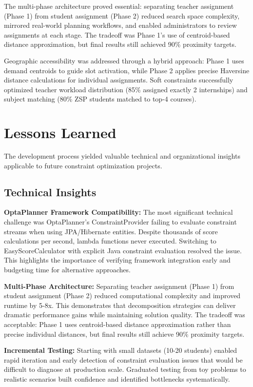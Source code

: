\documentclass[12pt,a4paper]{report}
\begin{document}
The multi-phase architecture proved essential: separating teacher assignment (Phase 1) from student assignment (Phase 2) reduced search space complexity, mirrored real-world planning workflows, and enabled administrators to review assignments at each stage. The tradeoff was Phase 1's use of centroid-based distance approximation, but final results still achieved 90\% proximity targets.

Geographic accessibility was addressed through a hybrid approach: Phase 1 uses demand centroids to guide slot activation, while Phase 2 applies precise Haversine distance calculations for individual assignments. Soft constraints successfully optimized teacher workload distribution (85\% assigned exactly 2 internships) and subject matching (80\% ZSP students matched to top-4 courses).

\section{Lessons Learned}

The development process yielded valuable technical and organizational insights applicable to future constraint optimization projects.

\subsection{Technical Insights}

\textbf{OptaPlanner Framework Compatibility:} The most significant technical challenge was OptaPlanner's ConstraintProvider failing to evaluate constraint streams when using JPA/Hibernate entities. Despite thousands of score calculations per second, lambda functions never executed. Switching to EasyScoreCalculator with explicit Java constraint evaluation resolved the issue. This highlights the importance of verifying framework integration early and budgeting time for alternative approaches.

\textbf{Multi-Phase Architecture:} Separating teacher assignment (Phase 1) from student assignment (Phase 2) reduced computational complexity and improved runtime by 5-8x. This demonstrates that decomposition strategies can deliver dramatic performance gains while maintaining solution quality. The tradeoff was acceptable: Phase 1 uses centroid-based distance approximation rather than precise individual distances, but final results still achieve 90\% proximity targets.

\textbf{Incremental Testing:} Starting with small datasets (10-20 students) enabled rapid iteration and early detection of constraint evaluation issues that would be difficult to diagnose at production scale. Graduated testing from toy problems to realistic scenarios built confidence and identified bottlenecks systematically.
\end{document}

